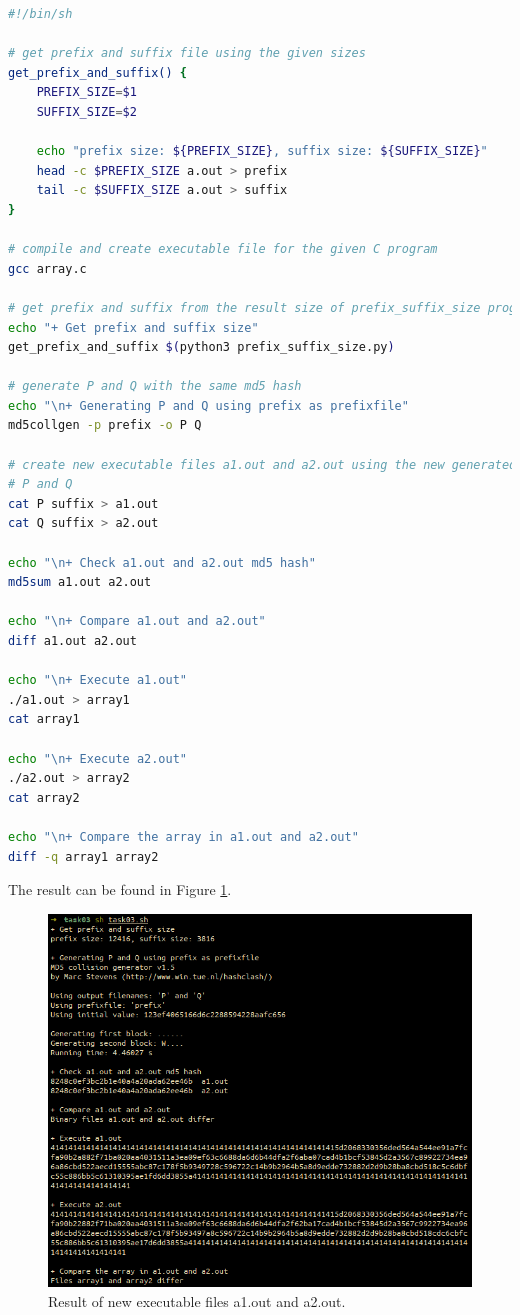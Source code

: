 \documentclass{article}
\begin{document}
\begin{lstlisting}[language=bash]
#!/bin/sh

# get prefix and suffix file using the given sizes
get_prefix_and_suffix() {
    PREFIX_SIZE=$1
    SUFFIX_SIZE=$2

    echo "prefix size: ${PREFIX_SIZE}, suffix size: ${SUFFIX_SIZE}"
    head -c $PREFIX_SIZE a.out > prefix
    tail -c $SUFFIX_SIZE a.out > suffix
}

# compile and create executable file for the given C program
gcc array.c

# get prefix and suffix from the result size of prefix_suffix_size program
echo "+ Get prefix and suffix size"
get_prefix_and_suffix $(python3 prefix_suffix_size.py)

# generate P and Q with the same md5 hash
echo "\n+ Generating P and Q using prefix as prefixfile"
md5collgen -p prefix -o P Q

# create new executable files a1.out and a2.out using the new generated prefix
# P and Q
cat P suffix > a1.out
cat Q suffix > a2.out

echo "\n+ Check a1.out and a2.out md5 hash"
md5sum a1.out a2.out

echo "\n+ Compare a1.out and a2.out"
diff a1.out a2.out

echo "\n+ Execute a1.out"
./a1.out > array1
cat array1

echo "\n+ Execute a2.out"
./a2.out > array2
cat array2

echo "\n+ Compare the array in a1.out and a2.out"
diff -q array1 array2
\end{lstlisting}

The result can be found in Figure \ref{fig:task3_result}.

\begin{figure}[!ht]
    \centering
    \includegraphics[scale=0.5]{task3.png}
    \caption{Result of new executable files a1.out and a2.out.}
    \label{fig:task3_result}
\end{figure}
\end{document}
